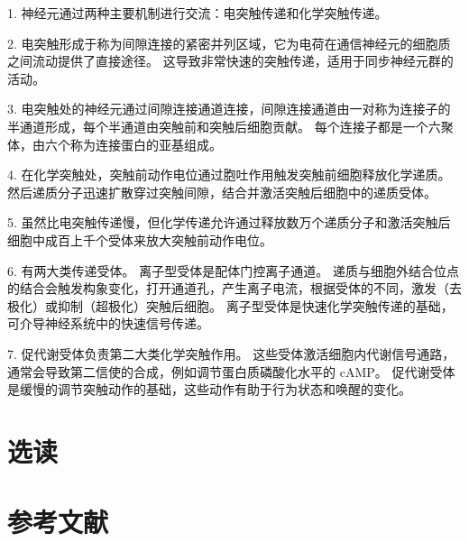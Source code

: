 1. 神经元通过两种主要机制进行交流：电突触传递和化学突触传递。 

2. 电突触形成于称为间隙连接的紧密并列区域，它为电荷在通信神经元的细胞质之间流动提供了直接途径。 这导致非常快速的突触传递，适用于同步神经元群的活动。 

3. 电突触处的神经元通过间隙连接通道连接，间隙连接通道由一对称为连接子的半通道形成，每个半通道由突触前和突触后细胞贡献。 每个连接子都是一个六聚体，由六个称为连接蛋白的亚基组成。 

4. 在化学突触处，突触前动作电位通过胞吐作用触发突触前细胞释放化学递质。 然后递质分子迅速扩散穿过突触间隙，结合并激活突触后细胞中的递质受体。 

5. 虽然比电突触传递慢，但化学传递允许通过释放数万个递质分子和激活突触后细胞中成百上千个受体来放大突触前动作电位。 

6. 有两大类传递受体。 离子型受体是配体门控离子通道。 递质与细胞外结合位点的结合会触发构象变化，打开通道孔，产生离子电流，根据受体的不同，激发（去极化）或抑制（超极化）突触后细胞。 离子型受体是快速化学突触传递的基础，可介导神经系统中的快速信号传递。 

7. 促代谢受体负责第二大类化学突触作用。 这些受体激活细胞内代谢信号通路，通常会导致第二信使的合成，例如调节蛋白质磷酸化水平的 cAMP。 促代谢受体是缓慢的调节突触动作的基础，这些动作有助于行为状态和唤醒的变化。

\section{选读}

\section{参考文献}